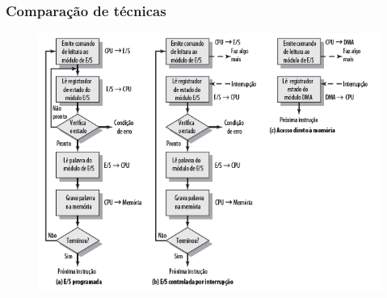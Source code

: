 \documentclass[aspectratio=169,
				xcolor=table]{beamer}
\begin{document}
	\begin{frame}
		\frametitle{Comparação de técnicas}
		\begin{figure}[hbtp]
		\centering
		\includegraphics[height=.8\textheight,keepaspectratio]{../figs/cap10/tecnicas.png}
		\end{figure}		
	\end{frame}
\end{document}
